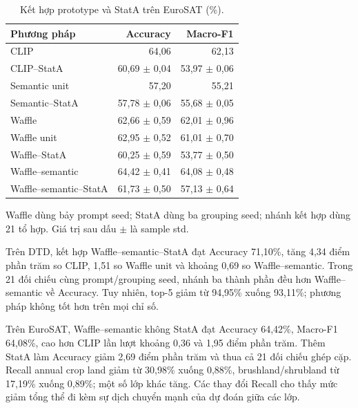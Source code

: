 \documentclass[12pt,a4paper]{article}
\newcommand{\BodySize}{13}
\newcommand{\BodyLeading}{15.6}
\newcommand{\BodyFont}{\fontsize{\BodySize}{\BodyLeading}\selectfont}
\numberwithin{figure}{section}
\numberwithin{table}{section}
\numberwithin{equation}{section}
\begin{document}
\begin{table}[H]

    \centering
    \BodyFont
    \caption{Kết hợp prototype và StatA trên EuroSAT (\%).}
    \begin{tabularx}{\linewidth}{@{}L R R@{}}
        \toprule
        Phương pháp & Accuracy & Macro-F1 \\
        \midrule
        CLIP & 64,06 & 62,13 \\
        CLIP--StatA & 60,69 $\pm$ 0,04 & 53,97 $\pm$ 0,06 \\
        Semantic unit & 57,20 & 55,21 \\
        Semantic--StatA & 57,78 $\pm$ 0,06 & 55,68 $\pm$ 0,05 \\
        Waffle & 62,66 $\pm$ 0,59 & 62,01 $\pm$ 0,96 \\
        Waffle unit & 62,95 $\pm$ 0,52 & 61,01 $\pm$ 0,70 \\
        Waffle--StatA & 60,25 $\pm$ 0,59 & 53,77 $\pm$ 0,50 \\
        Waffle--semantic & 64,42 $\pm$ 0,41 & 64,08 $\pm$ 0,48 \\
        Waffle--semantic--StatA & 61,73 $\pm$ 0,50 & 57,13 $\pm$ 0,64 \\
        \bottomrule
    \end{tabularx}
    \par\medskip
    \begin{minipage}{\linewidth}
        \BodyFont
Waffle dùng bảy prompt seed; StatA dùng ba grouping seed;
nhánh kết hợp dùng 21 tổ hợp. Giá trị sau dấu $\pm$ là sample std.
    
\end{minipage}

\end{table}

Trên DTD, kết hợp Waffle--semantic--StatA đạt Accuracy 71,10\%, tăng 4,34 điểm phần trăm so CLIP,
1,51 so Waffle unit và khoảng 0,69 so Waffle--semantic. Trong 21 đối chiếu cùng prompt/grouping
seed, nhánh ba thành phần đều hơn Waffle--semantic về Accuracy. Tuy nhiên, top-5 giảm từ 94,95\%
xuống 93,11\%; phương pháp không tốt hơn trên mọi chỉ số.

Trên EuroSAT, Waffle--semantic không StatA đạt Accuracy 64,42\%, Macro-F1 64,08\%, cao hơn CLIP lần
lượt khoảng 0,36 và 1,95 điểm phần trăm. Thêm StatA làm Accuracy giảm 2,69 điểm phần trăm và thua cả
21 đối chiếu ghép cặp. Recall annual crop land giảm từ 30,98\% xuống 0,88\%, brushland/shrubland từ
17,19\% xuống 0,89\%; một số lớp khác tăng. Các thay đổi Recall cho thấy mức giảm tổng thể đi kèm sự dịch chuyển mạnh của dự đoán giữa các lớp.
\end{document}
